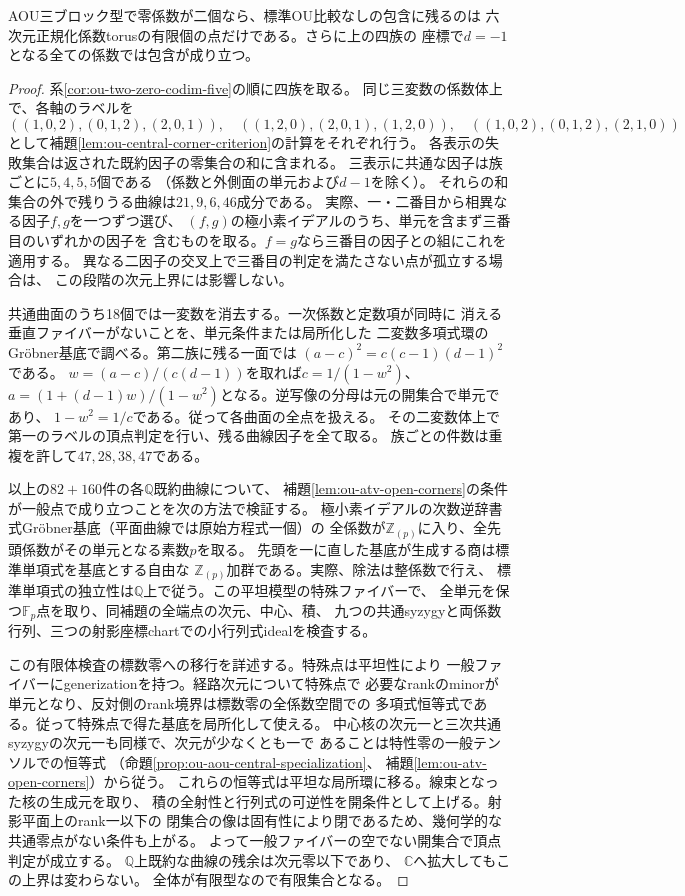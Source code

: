 \begin{theorem}[二零台の有限残余と$d=-1$の全特殊化]
\label{thm:ou-two-zero-finite-residual}
AOU三ブロック型で零係数が二個なら、標準OU比較なしの包含に残るのは
六次元正規化係数torusの有限個の点だけである。さらに上の四族の
座標で$d=-1$となる全ての係数では包含が成り立つ。
\end{theorem}
\begin{proof}
系\ref{cor:ou-two-zero-codim-five}の順に四族を取る。
同じ三変数の係数体上で、各軸のラベルを
\[
 ((1,0,2),(0,1,2),(2,0,1)),\quad
 ((1,2,0),(2,0,1),(1,2,0)),\quad
 ((1,0,2),(0,1,2),(2,1,0))
\]
として補題\ref{lem:ou-central-corner-criterion}の計算をそれぞれ行う。
各表示の失敗集合は返された既約因子の零集合の和に含まれる。
三表示に共通な因子は族ごとに$5,4,5,5$個である
（係数と外側面の単元および$d-1$を除く）。
それらの和集合の外で残りうる曲線は$21,9,6,46$成分である。
実際、一・二番目から相異なる因子$f,g$を一つずつ選び、
$(f,g)$の極小素イデアルのうち、単元を含まず三番目のいずれかの因子を
含むものを取る。$f=g$なら三番目の因子との組にこれを適用する。
異なる二因子の交叉上で三番目の判定を満たさない点が孤立する場合は、
この段階の次元上界には影響しない。

共通曲面のうち18個では一変数を消去する。一次係数と定数項が同時に
消える垂直ファイバーがないことを、単元条件または局所化した
二変数多項式環のGröbner基底で調べる。第二族に残る一面では
$(a-c)^2=c(c-1)(d-1)^2$である。
$w=(a-c)/(c(d-1))$を取れば$c=1/(1-w^2)$、
$a=(1+(d-1)w)/(1-w^2)$となる。逆写像の分母は元の開集合で単元であり、
$1-w^2=1/c$である。従って各曲面の全点を扱える。
その二変数体上で第一のラベルの頂点判定を行い、残る曲線因子を全て取る。
族ごとの件数は重複を許して$47,28,38,47$である。

以上の$82+160$件の各$\mathbb Q$既約曲線について、
補題\ref{lem:ou-atv-open-corners}の条件が一般点で成り立つことを次の方法で検証する。
極小素イデアルの次数逆辞書式Gröbner基底（平面曲線では原始方程式一個）の
全係数が$\mathbb Z_{(p)}$に入り、全先頭係数がその単元となる素数$p$を取る。
先頭を一に直した基底が生成する商は標準単項式を基底とする自由な
$\mathbb Z_{(p)}$加群である。実際、除法は整係数で行え、
標準単項式の独立性は$\mathbb Q$上で従う。この平坦模型の特殊ファイバーで、
全単元を保つ$\mathbb F_p$点を取り、同補題の全端点の次元、中心、積、
九つの共通syzygyと両係数行列、三つの射影座標chartでの小行列式idealを検査する。

この有限体検査の標数零への移行を詳述する。特殊点は平坦性により
一般ファイバーにgenerizationを持つ。経路次元について特殊点で
必要なrankのminorが単元となり、反対側のrank境界は標数零の全係数空間での
多項式恒等式である。従って特殊点で得た基底を局所化して使える。
中心核の次元一と三次共通syzygyの次元一も同様で、次元が少なくとも一で
あることは特性零の一般テンソルでの恒等式
（命題\ref{prop:ou-aou-central-specialization}、
補題\ref{lem:ou-atv-open-corners}）から従う。
これらの恒等式は平坦な局所環に移る。線束となった核の生成元を取り、
積の全射性と行列式の可逆性を開条件として上げる。射影平面上のrank一以下の
閉集合の像は固有性により閉であるため、幾何学的な共通零点がない条件も上がる。
よって一般ファイバーの空でない開集合で頂点判定が成立する。
$\mathbb Q$上既約な曲線の残余は次元零以下であり、
$\mathbb C$へ拡大してもこの上界は変わらない。
全体が有限型なので有限集合となる。


\end{proof}
